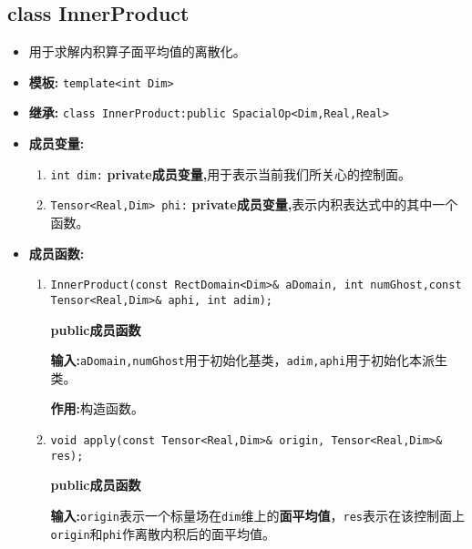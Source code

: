 \documentclass[UTF8]{ctexart}
\theoremstyle{plain}
\theoremstyle{definition}
\theoremstyle{remark}
\begin{document}
\subsection{class InnerProduct}
\begin{itemize}
    \item 用于求解内积算子面平均值的离散化。
    \item \textbf{模板:} \texttt{template<int Dim>}
    \item \textbf{继承:} \texttt{class InnerProduct:public SpacialOp<Dim,Real,Real>}
    \item \textbf{成员变量:}
    \begin{enumerate}
        \item \texttt{int dim:} \textbf{private成员变量,}用于表示当前我们所关心的控制面。
        \item \texttt{Tensor<Real,Dim> phi:} \textbf{private成员变量,}表示内积表达式中的其中一个函数。
    \end{enumerate}
    \item \textbf{成员函数:}
    \begin{enumerate}
        \item \texttt{InnerProduct(const RectDomain<Dim>\& aDomain, int numGhost,const Tensor<Real,Dim>\& aphi, int adim);}
        
        \textbf{public成员函数}

        \textbf{输入:}\texttt{aDomain,numGhost}用于初始化基类，\texttt{adim,aphi}用于初始化本派生类。

        \textbf{作用:}构造函数。

        \item \texttt{void apply(const Tensor<Real,Dim>\& origin, Tensor<Real,Dim>\& res);}
        
        \textbf{public成员函数}

        \textbf{输入:}\texttt{origin}表示一个标量场在\texttt{dim}维上的\textbf{面平均值}，\texttt{res}表示在该控制面上\texttt{origin}和\texttt{phi}作离散内积后的面平均值。
    \end{enumerate}
\end{itemize}
\end{document}
